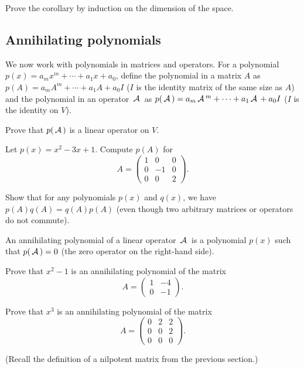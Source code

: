 \begin{exercise}
Prove the corollary by induction on the dimension of the space.
\end{exercise}

\subsection{Annihilating polynomials}

We now work with polynomials in matrices and operators. For a polynomial $p(x) = a_m x^m + \cdots + a_1 x + a_0$, define the polynomial in a matrix $A$ as $p(A) = a_m A^m + \cdots + a_1 A + a_0 I$ ($I$ is the identity matrix of the same size as $A$) and the polynomial in an operator $\,\mathcal{A}\,$ as $p(\,\mathcal{A}\,) = a_m \,\mathcal{A}\,^m + \cdots + a_1 \,\mathcal{A}\, + a_0 I$ ($I$ is the identity on $V$).

\begin{exercise}
Prove that $p(\,\mathcal{A}\,)$ is a linear operator on $V$.
\end{exercise}

\begin{exercise}
Let $p(x) = x^2 - 3x + 1$. Compute $p(A)$ for
$$A = \begin{pmatrix} 1 & 0 & 0 \\ 0 & -1 & 0 \\ 0 & 0 & 2 \end{pmatrix}.$$
\end{exercise}

\begin{exercise}
Show that for any polynomials $p(x)$ and $q(x)$, we have $p(A)q(A) = q(A)p(A)$ (even though two arbitrary matrices or operators do not commute).
\end{exercise}

\begin{definition}
An annihilating polynomial of a linear operator $\,\mathcal{A}\,$ is a polynomial $p(x)$ such that $p(\,\mathcal{A}\,) = 0$ (the zero operator on the right-hand side).
\end{definition}

\begin{exercise}
    Prove that $x^2 - 1$ is an annihilating polynomial of the matrix 
    $$A = \begin{pmatrix} 1 & -4 \\ 0 & -1 \end{pmatrix}.$$
\end{exercise}

\begin{exercise}
    Prove that $x^3$ is an annihilating polynomial of the matrix 
    $$A = \begin{pmatrix} 0 & 2 & 2 \\ 0 & 0 & 2 \\ 0 & 0 & 0 \end{pmatrix}.$$
\end{exercise}
(Recall the definition of a nilpotent matrix from the previous section.)

